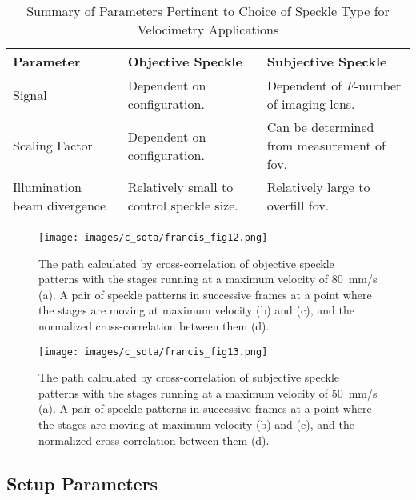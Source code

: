     \begin{table}[h]
        \centering
        \footnotesize
        \renewcommand{\arraystretch}{1.2}
        \begin{tabular}{p{3cm}p{5.5cm}p{5.5cm}}
            \toprule
            \textbf{Parameter} & \textbf{Objective Speckle} & \textbf{Subjective Speckle} \\
            \midrule
            Signal    & Dependent on configuration. & Dependent of \emph{F}-number of imaging lens. \\
            Scaling Factor  & Dependent on configuration. & Can be determined from measurement of  \gls{fov}. \\
            Illumination beam divergence & Relatively small to control speckle size. & Relatively large to overfill \gls{fov}. \\
            \bottomrule
        \end{tabular}
        \caption{Summary of Parameters Pertinent to Choice of Speckle Type for Velocimetry Applications \cite{francis_autonomous}}
        \label{table:francis_table1}
    \end{table}
    
    \begin{figure}[h]
        \centering
        \texttt{[image: images/c\_sota/francis\_fig12.png]}
        \caption{The path calculated by cross-correlation of objective speckle patterns with the stages running at a maximum velocity of \SI{80}{\milli\meter/\second} (a). A pair of speckle patterns in successive frames at a point where the stages are moving at maximum velocity (b) and (c), and the normalized cross-correlation between them (d).\cite{francis_autonomous}}
        \label{fig:francis_fig12}
    \end{figure}

    \begin{figure}[h]
        \centering
        \texttt{[image: images/c\_sota/francis\_fig13.png]}
        \caption{The path calculated by cross-correlation of subjective speckle patterns with the stages running at a maximum velocity of \SI{50}{\milli\meter/\second} (a). A pair of speckle patterns in successive frames at a point where the stages are moving at maximum velocity (b) and (c), and the normalized cross-correlation between them (d). \cite{francis_autonomous}}
        \label{fig:francis_fig13}
    \end{figure}
\clearpage

\subsection{Setup Parameters}

